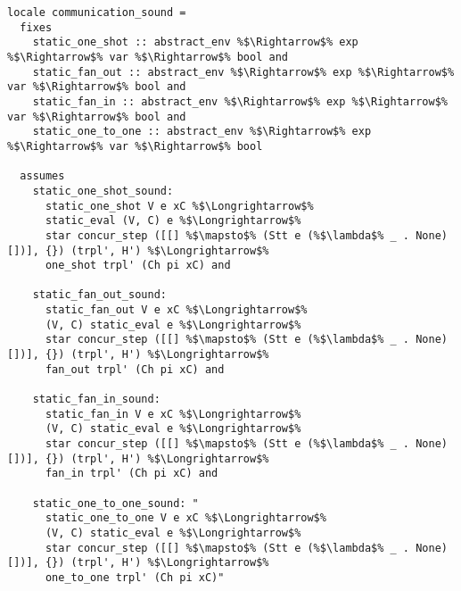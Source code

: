 \begin{lstlisting}[style=codestyle1, escapechar=\%]
locale communication_sound =
  fixes 
    static_one_shot :: abstract_env %$\Rightarrow$% exp %$\Rightarrow$% var %$\Rightarrow$% bool and
    static_fan_out :: abstract_env %$\Rightarrow$% exp %$\Rightarrow$% var %$\Rightarrow$% bool and 
    static_fan_in :: abstract_env %$\Rightarrow$% exp %$\Rightarrow$% var %$\Rightarrow$% bool and
    static_one_to_one :: abstract_env %$\Rightarrow$% exp %$\Rightarrow$% var %$\Rightarrow$% bool

  assumes 
    static_one_shot_sound:
      static_one_shot V e xC %$\Longrightarrow$%
      static_eval (V, C) e %$\Longrightarrow$%
      star concur_step ([[] %$\mapsto$% (Stt e (%$\lambda$% _ . None) [])], {}) (trpl', H') %$\Longrightarrow$%
      one_shot trpl' (Ch pi xC) and

    static_fan_out_sound: 
      static_fan_out V e xC %$\Longrightarrow$%
      (V, C) static_eval e %$\Longrightarrow$%
      star concur_step ([[] %$\mapsto$% (Stt e (%$\lambda$% _ . None) [])], {}) (trpl', H') %$\Longrightarrow$%
      fan_out trpl' (Ch pi xC) and

    static_fan_in_sound:
      static_fan_in V e xC %$\Longrightarrow$%
      (V, C) static_eval e %$\Longrightarrow$%
      star concur_step ([[] %$\mapsto$% (Stt e (%$\lambda$% _ . None) [])], {}) (trpl', H') %$\Longrightarrow$%
      fan_in trpl' (Ch pi xC) and

    static_one_to_one_sound: "
      static_one_to_one V e xC %$\Longrightarrow$%
      (V, C) static_eval e %$\Longrightarrow$%
      star concur_step ([[] %$\mapsto$% (Stt e (%$\lambda$% _ . None) [])], {}) (trpl', H') %$\Longrightarrow$%
      one_to_one trpl' (Ch pi xC)"
  \end{lstlisting}



